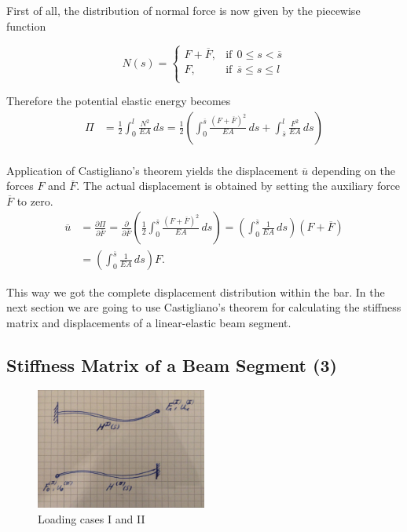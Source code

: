 First of all, the distribution of normal force is now given by the piecewise function

\begin{equation}
N(s) = \begin{cases}
F + \overline{F}, & \text{if}\ \ 0 \le s < \overline{s} \\
F, & \text{if}\ \ \overline{s} \le s \le l \\
\end{cases}
\end{equation}

Therefore the potential elastic energy becomes
%
\begin{align}
\Pi &= \frac{1}{2}\int_{0}^{l}\frac{N^2}{EA}\,ds = \frac{1}{2}\left(\int_{0}^{\overline{s}}\frac{(F + \overline{F})^2}{EA}\,ds + \int_{\overline{s}}^{l}\frac{F^2}{EA}\,ds\right) \\
\end{align}

Application of Castigliano's theorem yields the displacement $\overline{u}$ depending on the forces $F$ and $\overline{F}$.
The actual displacement is obtained by setting the auxiliary force $\overline{F}$ to zero.
%
\begin{align}
\overline{u} &= \frac{\partial \Pi}{\partial \overline{F}} = \frac{\partial}{\partial \overline{F}}\left( \frac{1}{2} \int_{0}^{\overline{s}}\frac{(F + \overline{F})^2}{EA}\,ds \right) = \left(\int_{0}^{\overline{s}}\frac{1}{EA}\,ds \right)\left(F + \overline{F}\right) \\
&= \left(\int_{0}^{\overline{s}}\frac{1}{EA}\,ds \right)F.
\end{align}

This way we got the complete displacement distribution within the bar.
In the next section we are going to use Castigliano's theorem for calculating the stiffness matrix and displacements of a linear-elastic beam segment.

\newpage
\subsection{Stiffness Matrix of a Beam Segment (3)}

\begin{figure}[h]
\centering
\includegraphics[width=0.5\textwidth]{figures/elements/castigliano-beam-cases.jpg}
\caption{Loading cases I and II}
\label{fig:castigliano-beam-cases}
\end{figure}

